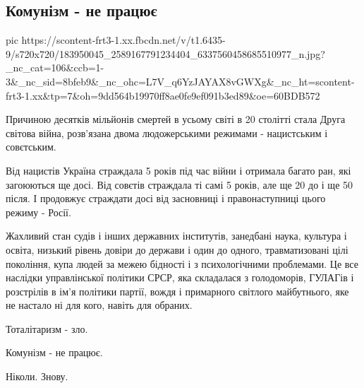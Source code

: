  
 
 
 
 
\subsection{Комунізм - не працює}
\label{sec:08_05_2021.fb.zhernakov_mihail.1.kommunizm}


\ifcmt
  pic https://scontent-frt3-1.xx.fbcdn.net/v/t1.6435-9/s720x720/183950045_2589167791234404_6337560458685510977_n.jpg?_nc_cat=106&ccb=1-3&_nc_sid=8bfeb9&_nc_ohc=L7V_q6YzJAYAX8vGWXg&_nc_ht=scontent-frt3-1.xx&tp=7&oh=9dd564b19970ff8ae0fe9ef091b3ed89&oe=60BDB572
\fi


Причиною десятків мільйонів смертей в усьому світі в 20 столітті стала Друга
світова війна, розв'язана двома людожерськими режимами - нацистським і
совєтським.

Від нацистів Україна страждала 5 років під час війни і отримала багато ран, які
загоюються ще досі. Від совєтів страждала ті самі 5 років, але ще 20 до і ще 50
після. І продовжує страждати досі від засновниці і правонаступниці цього режиму
- Росії.

Жахливий стан судів і інших державних інститутів, занедбані наука, культура і
освіта, низький рівень довіри до держави і один до одного, травматизовані цілі
покоління, купа людей за межею бідності і з психологічними проблемами. Це все
наслідки управлінської політики СРСР, яка складалася з голодоморів, ГУЛАГів і
розстрілів в ім'я політики партії, вождя і примарного світлого майбутнього, яке
не настало ні для кого, навіть для обраних.

Тоталітаризм - зло.

Комунізм - не працює.

Ніколи. Знову.

